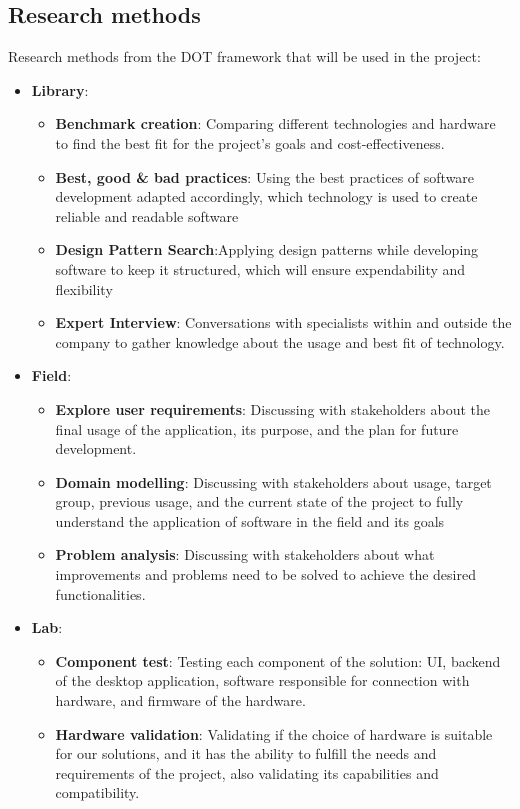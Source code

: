 \documentclass[a4paper, 11pt]{article}
\begin{document}
\subsection{Research methods}
Research methods from the DOT framework that will be used in the project:
\begin{itemize}
  \item \textbf{Library}:
  \begin{itemize}
    \item \textbf{Benchmark creation}: Comparing different technologies and hardware to find the best fit for the project's goals and cost-effectiveness.
    \item\textbf{Best, good \& bad practices}: Using the best practices of software development adapted accordingly, which technology is used to create reliable and readable software
    \item \textbf{Design Pattern Search}:Applying design patterns while developing software to keep it structured, which will ensure expendability and flexibility 
    \item \textbf{Expert Interview}: Conversations with specialists within and outside the company to gather knowledge about the usage and best fit of technology.
  \end{itemize}
  \pagebreak
  \item \textbf{Field}:
  \begin{itemize}
    \item \textbf{Explore user requirements}: Discussing with stakeholders about the final usage of the application, its purpose, and the plan for future development.
    \item\textbf{Domain modelling}: Discussing with stakeholders about usage, target group, previous usage, and the current state of the project to fully understand the application of software in the field and its goals
    \item \textbf{Problem analysis}: Discussing with stakeholders about what improvements and problems need to be solved to achieve the desired functionalities.
  \end{itemize}
  \item \textbf{Lab}: 
  \begin{itemize}
    \item \textbf{Component test}: Testing each component of the solution: UI, backend of the desktop application, software responsible for connection with hardware, and firmware of the hardware.
    \item\textbf{Hardware validation}: Validating if the choice of hardware is suitable for our solutions, and it has the ability to fulfill the needs and requirements of the project, also validating its capabilities and compatibility.

\end{itemize}
\end{itemize}
\end{document}
